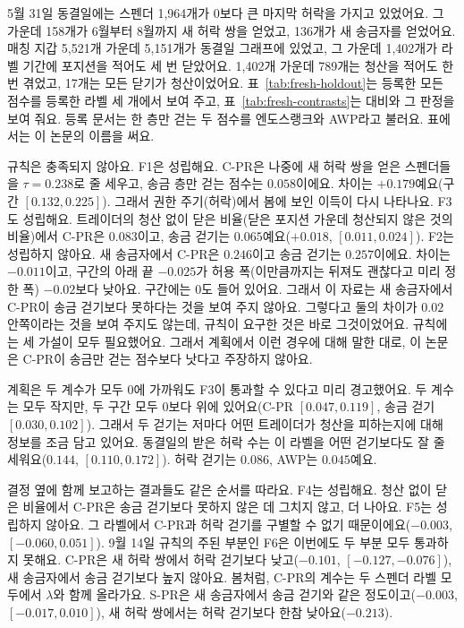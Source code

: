5월 31일 동결일에는 스펜더 1,964개가 0보다 큰 마지막 허락을 가지고 있었어요. 그 가운데 158개가 6월부터 8월까지 새 허락 쌍을 얻었고, 136개가 새 송금자를 얻었어요. 매칭 지갑 5,521개 가운데 5,151개가 동결일 그래프에 있었고, 그 가운데 1,402개가 라벨 기간에 포지션을 적어도 세 번 닫았어요. 1,402개 가운데 789개는 청산을 적어도 한 번 겪었고, 17개는 모든 닫기가 청산이었어요. 표~\ref{tab:fresh-holdout}는 등록한 모든 점수를 등록한 라벨 세 개에서 보여 주고, 표~\ref{tab:fresh-contrasts}는 대비와 그 판정을 보여 줘요. 등록 문서는 한 층만 걷는 두 점수를 엔도스랭크와 AWP라고 불러요. 표에서는 이 논문의 이름을 써요.





규칙은 충족되지 않아요. F1은 성립해요. C-PR은 나중에 새 허락 쌍을 얻은 스펜더들을 $\tau=0.238$로 줄 세우고, 송금 층만 걷는 점수는 $0.058$이에요. 차이는 $+0.179$예요(구간 $[0.132,0.225]$). 그래서 권한 주기(허락)에서 봄에 보인 이득이 다시 나타나요. F3도 성립해요. 트레이더의 청산 없이 닫은 비율(닫은 포지션 가운데 청산되지 않은 것의 비율)에서 C-PR은 $0.083$이고, 송금 걷기는 $0.065$예요($+0.018$, $[0.011,0.024]$). F2는 성립하지 않아요. 새 송금자에서 C-PR은 $0.246$이고 송금 걷기는 $0.257$이에요. 차이는 $-0.011$이고, 구간의 아래 끝 $-0.025$가 허용 폭(이만큼까지는 뒤져도 괜찮다고 미리 정한 폭) $-0.02$보다 낮아요. 구간에는 0도 들어 있어요. 그래서 이 자료는 새 송금자에서 C-PR이 송금 걷기보다 못하다는 것을 보여 주지 않아요. 그렇다고 둘의 차이가 $0.02$ 안쪽이라는 것을 보여 주지도 않는데, 규칙이 요구한 것은 바로 그것이었어요. 규칙에는 세 가설이 모두 필요했어요. 그래서 계획에서 이런 경우에 대해 말한 대로, 이 논문은 C-PR이 송금만 걷는 점수보다 낫다고 주장하지 않아요.

계획은 두 계수가 모두 0에 가까워도 F3이 통과할 수 있다고 미리 경고했어요. 두 계수는 모두 작지만, 두 구간 모두 0보다 위에 있어요(C-PR $[0.047,0.119]$, 송금 걷기 $[0.030,0.102]$). 그래서 두 걷기는 저마다 어떤 트레이더가 청산을 피하는지에 대해 정보를 조금 담고 있어요. 동결일의 받은 허락 수는 이 라벨을 어떤 걷기보다도 잘 줄 세워요($0.144$, $[0.110,0.172]$). 허락 걷기는 $0.086$, AWP는 $0.045$예요.

결정 옆에 함께 보고하는 결과들도 같은 순서를 따라요. F4는 성립해요. 청산 없이 닫은 비율에서 C-PR은 송금 걷기보다 못하지 않은 데 그치지 않고, 더 나아요. F5는 성립하지 않아요. 그 라벨에서 C-PR과 허락 걷기를 구별할 수 없기 때문이에요($-0.003$, $[-0.060,0.051]$). 9월 14일 규칙의 주된 부분인 F6은 이번에도 두 부분 모두 통과하지 못해요. C-PR은 새 허락 쌍에서 허락 걷기보다 낮고($-0.101$, $[-0.127,-0.076]$), 새 송금자에서 송금 걷기보다 높지 않아요. 봄처럼, C-PR의 계수는 두 스펜더 라벨 모두에서 $\lambda$와 함께 올라가요. S-PR은 새 송금자에서 송금 걷기와 같은 정도이고($-0.003$, $[-0.017,0.010]$), 새 허락 쌍에서는 허락 걷기보다 한참 낮아요($-0.213$).

